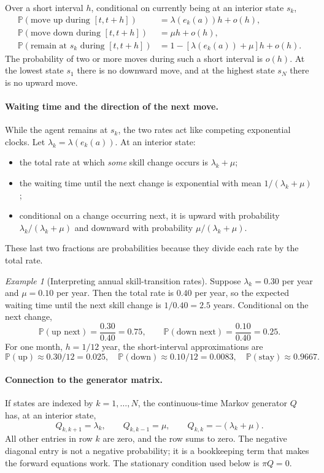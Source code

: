 \documentclass[11pt]{article}
\theoremstyle{tutorial}
\theoremstyle{remark}
\newtheorem{example}[theorem]{Example}
\newcommand{\Pp}{\mathbb{P}}
\newcommand{\1}{\mathbb{I}}
\begin{document}
Over a short interval $h$, conditional on currently being at an interior state $s_k$,
\begin{align*}
\Pp(\text{move up during }[t,t+h])
  &=\lambda(e_k(a))h+o(h),\\
\Pp(\text{move down during }[t,t+h])
  &=\mu h+o(h),\\
\Pp(\text{remain at }s_k\text{ during }[t,t+h])
  &=1-[\lambda(e_k(a))+\mu]h+o(h).
\end{align*}
The probability of two or more moves during such a short interval is $o(h)$.  At the lowest state $s_1$
there is no downward move, and at the highest state $s_N$ there is no upward move.

\paragraph{Waiting time and the direction of the next move.}
While the agent remains at $s_k$, the two rates act like competing exponential clocks.  Let
$\lambda_k=\lambda(e_k(a))$.  At an interior state:
\begin{itemize}
  \item the total rate at which \emph{some} skill change occurs is $\lambda_k+\mu$;
  \item the waiting time until the next change is exponential with mean $1/(\lambda_k+\mu)$;
  \item conditional on a change occurring next, it is upward with probability
  $\lambda_k/(\lambda_k+\mu)$ and downward with probability $\mu/(\lambda_k+\mu)$.
\end{itemize}
These last two fractions are probabilities because they divide each rate by the total rate.

\begin{example}[Interpreting annual skill-transition rates]
Suppose $\lambda_k=0.30$ per year and $\mu=0.10$ per year.  Then the total rate is $0.40$ per year, so the
expected waiting time until the next skill change is $1/0.40=2.5$ years.  Conditional on the next change,
\[
\Pp(\text{up next})=\frac{0.30}{0.40}=0.75,
\qquad
\Pp(\text{down next})=\frac{0.10}{0.40}=0.25.
\]
For one month, $h=1/12$ year, the short-interval approximations are
\[
\Pp(\text{up})\approx0.30/12=0.025,
\quad
\Pp(\text{down})\approx0.10/12=0.0083,
\quad
\Pp(\text{stay})\approx0.9667.
\]
\end{example}

\paragraph{Connection to the generator matrix.}
If states are indexed by $k=1,\ldots,N$, the continuous-time Markov generator $Q$ has, at an interior
state,
\[
Q_{k,k+1}=\lambda_k,
\qquad Q_{k,k-1}=\mu,
\qquad Q_{k,k}=-(\lambda_k+\mu).
\]
All other entries in row $k$ are zero, and the row sums to zero.  The negative diagonal entry is not a
negative probability; it is a bookkeeping term that makes the forward equations work.  The stationary
condition used below is $\pi Q=0$.
\end{document}
